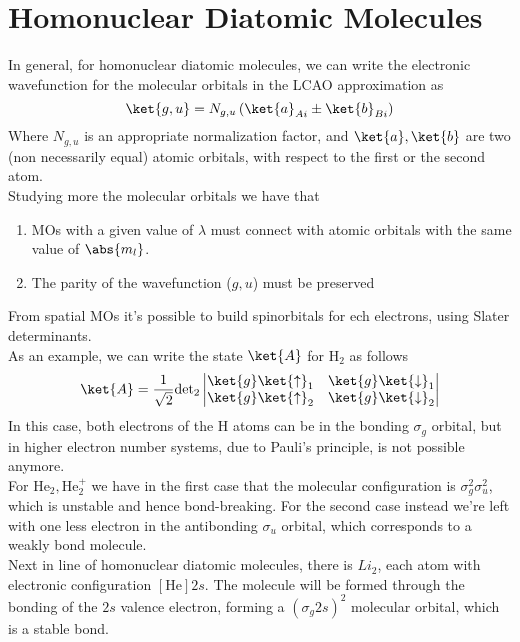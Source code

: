 \documentclass[a4paper, 11pt]{book}
\newcommand{\1}{\opr{\mathds{1}}}
\theoremstyle{plain}
\begin{document}
	\section{Homonuclear Diatomic Molecules}
	In general, for homonuclear diatomic molecules, we can write the electronic wavefunction for the molecular orbitals in the LCAO approximation as
	\begin{equation*}
		\ket{g,u}=N_{g,u}\left( \ket{a}_{Ai}\pm\ket{b}_{Bi} \right)
	\end{equation*}
	Where $N_{g,u}$ is an appropriate normalization factor, and $\ket{a},\ket{b}$ are two (non necessarily equal) atomic orbitals, with respect to the first or the second atom.\\
	Studying more the molecular orbitals we have that
	\begin{enumerate}
	\item MOs with a given value of $\lambda$ must connect with atomic orbitals with the same value of $\abs{m_l}$.
	\item The parity of the wavefunction ($g,u$) must be preserved
	\end{enumerate}
	From spatial MOs it's possible to build spinorbitals for ech electrons, using Slater determinants.\\
	As an example, we can write the state $\ket{A}$ for $\mathrm{H}_2$ as follows
	\begin{equation}
		\ket{A}=\frac{1}{\sqrt{2}}\mathrm{det}_2\left|\begin{matrix}
				\ket{g}\ket{\uparrow}_1&\ket{g}\ket{\downarrow}_1\\
				\ket{g}\ket{\uparrow}_2&\ket{g}\ket{\downarrow}_2
			\end{matrix}\right|
		\label{eq:ketah2matrix}
	\end{equation}
	In this case, both electrons of the $\mathrm{H}$ atoms can be in the bonding $\sigma_g$ orbital, but in higher electron number systems, due to Pauli's principle, is not possible anymore.\\
	For $\mathrm{He}_2,\mathrm{He}_2^+$ we have in the first case that the molecular configuration is $\sigma_g^2\sigma_u^2$, which is unstable and hence bond-breaking. For the second case instead we're left with one less electron in the antibonding $\sigma_u$ orbital, which corresponds to a weakly bond molecule.\\
	Next in line of homonuclear diatomic molecules, there is $Li_2$, each atom with electronic configuration $[\mathrm{He}]2s$. The molecule will be formed through the bonding of the $2s$ valence electron, forming a $\left( \sigma_g 2s \right)^2$ molecular orbital, which is a stable bond.\\
\end{document}
